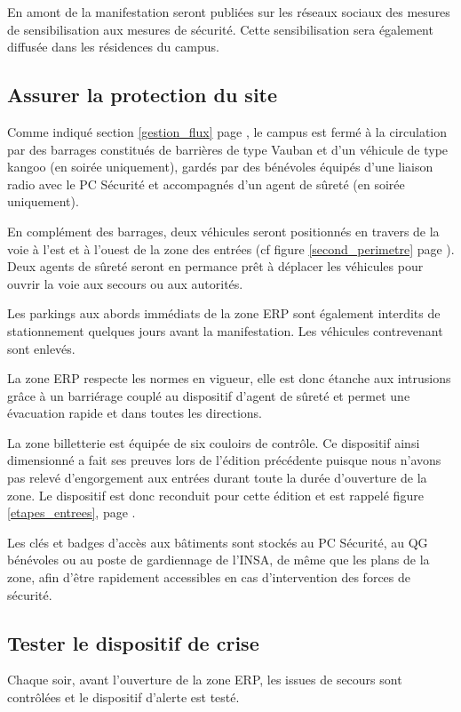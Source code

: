 \documentclass[hidelinks, paper=a4, fontsize=13pt]{report}
\begin{document}
En amont de la manifestation seront publiées sur les réseaux sociaux des mesures de sensibilisation aux mesures de sécurité. Cette sensibilisation sera également diffusée dans les résidences du campus.

\subsection{Assurer la protection du site}
\begin{list}{•}{}
	\item Comme indiqué section \ref{gestion_flux} page \pageref{gestion_flux}, le campus est fermé à la circulation par des barrages constitués de barrières de type Vauban et d'un véhicule de type kangoo (en soirée uniquement), gardés par des bénévoles équipés d'une liaison radio avec le PC Sécurité et accompagnés d'un agent de sûreté (en soirée uniquement).
	\item En complément des barrages, deux véhicules seront positionnés en travers de la voie à l'est et à l'ouest de la zone des entrées (cf figure \ref{second_perimetre} page \pageref{second_perimetre}). Deux agents de sûreté seront en permance prêt à déplacer les véhicules pour ouvrir la voie aux secours ou aux autorités.
	\item Les parkings aux abords immédiats de la zone ERP sont également interdits de stationnement quelques jours avant la manifestation. Les véhicules contrevenant sont enlevés.
	\item La zone ERP respecte les normes en vigueur, elle est donc étanche aux intrusions grâce à un barriérage couplé au dispositif d'agent de sûreté et permet une évacuation rapide et dans toutes les directions.
	\item La zone billetterie est équipée de six couloirs de contrôle. Ce dispositif ainsi dimensionné a fait ses preuves lors de l'édition précédente puisque nous n'avons pas relevé d'engorgement aux entrées durant toute la durée d'ouverture de la zone. Le dispositif est donc reconduit pour cette édition et est rappelé figure \ref{etapes_entrees}, page \pageref{etapes_entrees}.
	\item Les clés et badges d'accès aux bâtiments sont stockés au PC Sécurité, au QG bénévoles ou au poste de gardiennage de l'INSA, de même que les plans de la zone, afin d'être rapidement accessibles en cas d'intervention des forces de sécurité.
\end{list}

\subsection{Tester le dispositif de crise}
Chaque soir, avant l'ouverture de la zone ERP, les issues de secours sont contrôlées et le dispositif d'alerte est testé.\\
\end{document}
